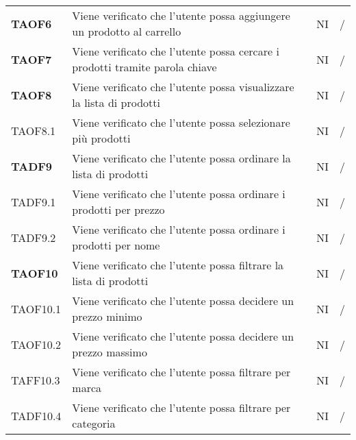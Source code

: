 \begin{center}
\begin{longtable}[!h]{p{60px} p{240px} p{35px} p{35px}}
        \textbf{TAOF6}  & Viene verificato che l'utente possa aggiungere un prodotto al carrello                                               & NI             & /              \\
        \textbf{TAOF7}  & Viene verificato che l'utente possa cercare i prodotti tramite parola chiave                                         & NI             & /              \\
        \textbf{TAOF8}  & Viene verificato che l'utente possa visualizzare la lista di prodotti                                                & NI             & /              \\
        TAOF8.1         & Viene verificato che l'utente possa selezionare più prodotti                                                         & NI             & /              \\
        \textbf{TADF9}  & Viene verificato che l'utente possa ordinare la lista di prodotti                                                    & NI             & /              \\
        TADF9.1         & Viene verificato che l'utente possa ordinare i prodotti per prezzo                                                   & NI             & /              \\
        TADF9.2         & Viene verificato che l'utente possa ordinare i prodotti per nome                                                     & NI             & /              \\
        \textbf{TAOF10} & Viene verificato che l'utente possa filtrare la lista di prodotti                                                    & NI             & /              \\
        TAOF10.1        & Viene verificato che l'utente possa decidere un prezzo minimo                                                        & NI             & /              \\
        TAOF10.2        & Viene verificato che l'utente possa decidere un prezzo massimo                                                       & NI             & /              \\
        TAFF10.3        & Viene verificato che l'utente possa filtrare per marca                                                               & NI             & /              \\
        TADF10.4        & Viene verificato che l'utente possa filtrare per categoria                                                           & NI             & /              \\

\end{longtable}
\end{center}
